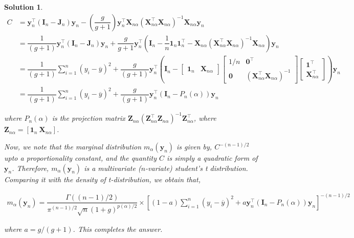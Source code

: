 \documentclass[12pt]{article}
\theoremstyle{problemstyle}
\newtheorem*{solution*}{Solution}
\newcommand{\bb}[1]{\boldsymbol{#1}}
\newcommand{\transpose}{^\intercal}
\begin{document}
\begin{solution*}
    \begin{align*}
        C
        & = \bb{y}_n \transpose (\bb{I}_n - \bb{J}_n) \bb{y}_n - \left(\dfrac{g}{g+1}\right) \bb{y}_n\transpose \bb{X}_{n\alpha} \left( \bb{X}_{n\alpha}\transpose \bb{X}_{n\alpha}  \right)^{-1} \bb{X}_{n\alpha} \bb{y}_n\\
        & = \dfrac{1}{(g+1)} \bb{y}_n \transpose (\bb{I}_n - \bb{J}_n) \bb{y}_n + \dfrac{g}{g+1} \bb{y}_n\transpose \left(\bb{I}_n - \dfrac{1}{n}\bb{1}_n\bb{1}_n\transpose -  \bb{X}_{n\alpha} \left( \bb{X}_{n\alpha}\transpose \bb{X}_{n\alpha}  \right)^{-1} \bb{X}_{n\alpha}\right)\bb{y}_n\\
        & = \dfrac{1}{(g+1)}\sum_{i=1}^n (y_i - \overline{y})^2 + \dfrac{g}{(g+1)} \bb{y}_n\transpose \left( \bb{I}_n - 
        \begin{bmatrix}
            \bb{1}_n & \bb{X}_{n\alpha}
        \end{bmatrix}
        \begin{bmatrix}
            1/n & \bb{0}\transpose\\
            \bb{0} & (\bb{X}_{n\alpha}\transpose \bb{X}_{n\alpha})^{-1}
        \end{bmatrix}
        \begin{bmatrix}
            \bb{1}\transpose\\
            \bb{X}_{n\alpha}\transpose
        \end{bmatrix}
        \right)\bb{y}_n \\
        & = \dfrac{1}{(g+1)}\sum_{i=1}^n (y_i - \overline{y})^2 + \dfrac{g}{(g+1)} \bb{y}_n\transpose \left( \bb{I}_n - P_n(\alpha)\right) \bb{y}_n
    \end{align*}

    where $P_n(\alpha)$ is the projection matrix $\bb{Z}_{n\alpha}(\bb{Z}_{n\alpha}\transpose \bb{Z}_{n\alpha})^{-1} \bb{Z}_{n\alpha}\transpose$, where $\bb{Z}_{n\alpha} = [\bb{1}_n \ \bb{X}_{n\alpha}]$.


    Now, we note that the marginal distribution $m_\alpha(\bb{y}_n)$ is given by, $C^{-(n-1)/2}$ upto a proportionality constant, and the quantity $C$ is simply a quadratic form of $\bb{y}_n$. Therefore, $m_{\alpha}(\bb{y}_n)$ is a multivariate ($n$-variate) student's t distribution. Comparing it with the density of t-distribution, we obtain that, 

    \begin{multline*}
        m_\alpha(\bb{y}_n) = \dfrac{\Gamma((n-1)/2)}{\pi^{(n-1)/2}\sqrt{n} (1 + g)^{p(\alpha)/2}} \times
        \left[ (1-a)\sum_{i=1}^n (y_i - \overline{y})^2 + a \bb{y}_n\transpose \left( \bb{I}_n - P_n(\alpha)\right) \bb{y}_n \right]^{-(n-1)/2}
    \end{multline*}

    where $a = g/(g+1)$. This completes the answer.
\end{solution*}
\pagebreak
\end{document}
